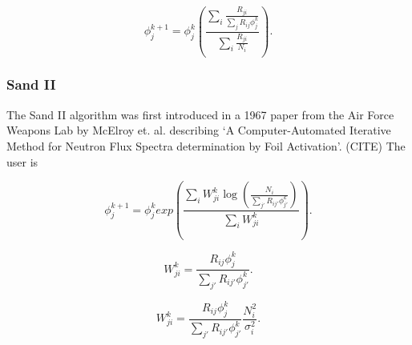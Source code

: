 \begin{equation}\label{eqn:doroshenko}
\phi_j^{k + 1} = \phi_j^{k} (\frac{\sum_i \frac{R_{ji}}{\sum_j R_{ij} \phi_j^k}}{\sum_i \frac{R_{ji}}{N_i}}) .
\end{equation}


\subsubsection{Sand II}

The Sand II algorithm was first introduced in a 1967 paper from the Air Force Weapons Lab by McElroy et. al. describing `A Computer-Automated Iterative Method for Neutron Flux Spectra determination by Foil Activation'. (CITE)
The user is 



\begin{equation}\label{eqn:sandii}
\phi_j^{k + 1} = \phi_j^{k} exp(\frac{\sum_i W_{ji}^k \log(\frac{N_i}{\sum_{j'} R_{ij'} \phi_{j'}^k})}{\sum_i W_{ji}^k}) .
\end{equation}

\begin{equation}\label{eqn:sandii-w}
W_{ji}^k = \frac{R_{ij} \phi_{j}^k}{\sum_{j'} R_{ij'} \phi_{j'}^k} .
\end{equation}

\begin{equation}\label{eqn:gravel-w}
W_{ji}^k = \frac{R_{ij} \phi_{j}^k}{\sum_{j'} R_{ij'} \phi_{j'}^k} \frac{N_i^2}{\sigma_i^2} .
\end{equation}

